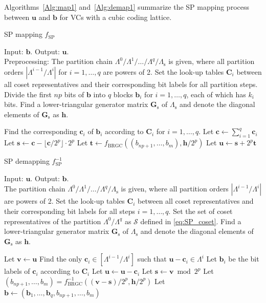 \documentclass[journal]{IEEEtran}
\newcommand{\bb}{\boldsymbol{b}}
\newcommand{\bc}{\boldsymbol{c}}
\newcommand{\bh}{\boldsymbol{h}}
\newcommand{\bs}{\boldsymbol{s}}
\newcommand{\bt}{\boldsymbol{t}}
\newcommand{\bu}{\boldsymbol{u}}
\newcommand{\bv}{\boldsymbol{v}}
\newcommand{\bx}{\boldsymbol{x}}
\newcommand{\bC}{\boldsymbol{C}}
\newcommand{\bGs}{\boldsymbol{G}_\mathrm{s}}
\newcommand{\Lambdas}{\Lambda_\mathrm{s}}
\begin{document}
Algorithms~\ref{Alg:map1} and~\ref{Alg:demap1} summarize the SP mapping process between $\bu$ and $\bb$ for VCs with a cubic coding lattice. 

\begin{algorithm}[tbp]
	\caption{SP mapping $f_\text{SP}$}\label{Alg:map1} 
	Input: $\bb$. Output: $\bu$.\\
	Preprocessing: The partition chain $\Lambda^0/\Lambda^1/\dots/\Lambda^q/\Lambdas$ is given, where all partition orders $|\Lambda^{i-1}/\Lambda^i|$ for $i=1,\ldots,q$ are powers of 2. Set the look-up tables $\bC_i$ between all coset representatives and their corresponding bit labels for all partition steps. Divide the first $np$ bits of $\bb$ into $q$ blocks $\bb_i$ for $i=1,\ldots,q$, each of which has $k_i$ bits. Find a lower-triangular generator matrix $\bGs$ of $\Lambdas$ and denote the diagonal elements of $\bGs$ as $\bh$.
	\begin{algorithmic}[1]
        \State Find the corresponding $\bc_i$ of $\bb_i$ according to $\bC_i$ for ${i=1,\ldots,q}$.
	    \State Let $\bc \leftarrow\sum_{i=1}^{q}\bc_i$
            \State Let $\bs \leftarrow \bc- \lfloor\bc/2^p\rfloor \cdot 2^p$
	    \State Let $\bt\leftarrow f_{\text{BRGC}}((b_{np+1},\dots,b_m),\bh/2^p)$
	    \State Let $\bu \leftarrow \bs+2^p\bt$
	\end{algorithmic} 
\end{algorithm}

\begin{algorithm}[tbp]
	\caption{SP demapping $f^{-1}_{\text{SP}}$} \label{Alg:demap1} 
	Input: $\bu$. Output: $\bb$.\\
        The partition chain $\Lambda^0/\Lambda^1/\dots/\Lambda^q/\Lambdas$ is given, where all partition orders $|\Lambda^{i-1}/\Lambda^i|$ are powers of 2. Set the look-up tables $\bC_i$ between all coset representatives and their corresponding bit labels for all steps $i=1,\ldots,q$. Set the set of coset representatives of the partition $\Lambda^0/\Lambda^q$ as $\mathcal{S}$ defined in \eqref{eq:SP_coset}. Find a lower-triangular generator matrix $\bGs$ of $\Lambdas$ and denote the diagonal elements of $\bGs$ as $\bh$.

	\begin{algorithmic}[1]
         \State Let $\bv\leftarrow \bu$
        \State Find the only $\bc_i \in [\Lambda^{i-1}/\Lambda^i]$ such that $\bu-\bc_i\in\Lambda^i$
        \State Let $\bb_i$ be the bit labels of $\bc_i$ according to $\bC_i$
	\State Let $\bu \leftarrow \bu - \bc_i $
	    \EndFor
        \State Let $\bs\leftarrow \bv \bmod 2^p$
        \State Let $(b_{np+1},\dots,b_m)=f^{-1}_{\text{BRGC}}\left((\bv-\bs)/2^p,\bh/2^p\right)$
        \State Let $\bb\leftarrow(\bb_1,\dots,\bb_{q},b_{np+1},\dots,b_m)$

	\end{algorithmic} 
\end{algorithm}
\end{document}
